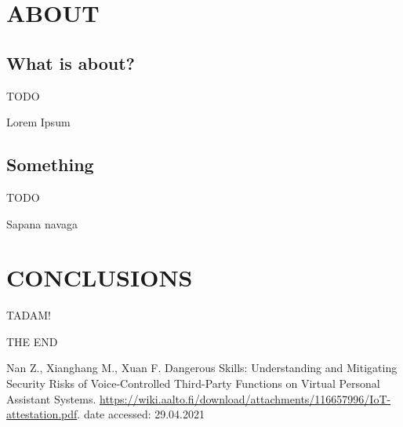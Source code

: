 \documentclass[letterpaper, 10 pt, conference]{ieeeconf}  %
\begin{document}

\section{ABOUT}
\subsection{What is about?}


TODO

Lorem Ipsum

\subsection{Something}

TODO

Sapana navaga

\section{CONCLUSIONS}
TADAM! 

THE END


\addtolength{\textheight}{-12cm}   %



\begin{thebibliography}{99}

 Nan Z., Xianghang M., Xuan F. Dangerous Skills: Understanding and Mitigating Security Risks of Voice-Controlled Third-Party Functions on Virtual Personal Assistant Systems. \url{https://wiki.aalto.fi/download/attachments/116657996/IoT-attestation.pdf}. date accessed: 29.04.2021


\end{thebibliography}
\end{document}

